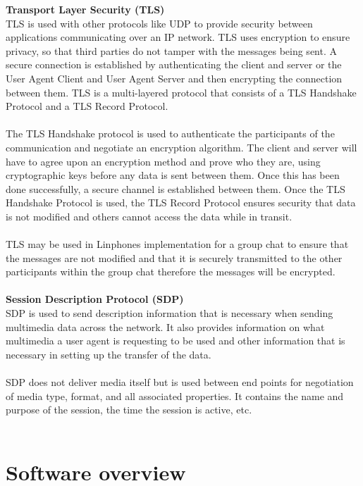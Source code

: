 \documentclass[a4paper]{article}
\begin{document}
\textbf{\large Transport Layer Security (TLS)\\}
TLS is used with other protocols like UDP to provide security between applications communicating over an IP network. TLS uses encryption to ensure privacy, so that third parties do not tamper with the messages being sent. A secure connection is established by authenticating the client and server or the User Agent Client and User Agent Server and then encrypting the connection between them. TLS is a multi-layered protocol that consists of a TLS Handshake Protocol and a TLS Record Protocol.\\
\\
The TLS Handshake protocol is used to authenticate the participants of the communication and negotiate an encryption algorithm. The client and server will have to agree upon an encryption method and prove who they are, using cryptographic keys before any data is sent between them. Once this has been done successfully, a secure channel is established between them. Once the TLS Handshake Protocol is used, the TLS Record Protocol ensures security that data is not modified and others cannot access the data while in transit.\\ 
\\
TLS may be used in Linphones implementation for a group chat to ensure that the messages are not modified and that it is securely transmitted to the other participants within the group chat therefore  the messages will be encrypted.\\
\\

\textbf{Session Description Protocol (SDP)\\}
SDP is used to send description information that is necessary when sending multimedia data across the network. It also provides information on what multimedia a user agent is requesting to be used and other information that is necessary in setting up the transfer of the data.\\
\\
SDP does not deliver media itself but is used between end points for negotiation of media type, format, and all associated properties. It contains the name and purpose of the session, the time the session is active, etc.\\
\\

\newpage

\section{Software overview}
\end{document}

